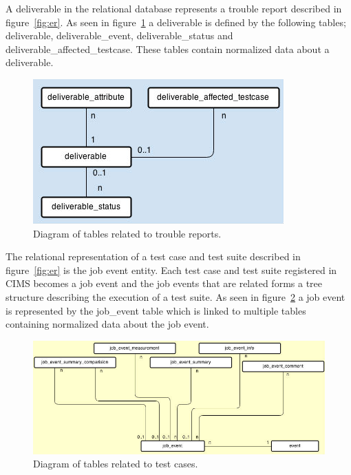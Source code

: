 A deliverable in the relational database represents a trouble report described in figure~\ref{fig:er}. As seen in figure~\ref{fig:deliverable} a deliverable is defined by the following tables; deliverable, deliverable\_event, deliverable\_status and deliverable\_affected\_testcase. These tables contain normalized data about a deliverable. 
\begin{figure}[h!]
\centering
\includegraphics[scale=0.5]{figure/deliverable.jpg}
\caption{Diagram of tables related to trouble reports.}
\label{fig:deliverable}
\end{figure}

The relational representation of a test case and test suite described in figure~\ref{fig:er} is the job event entity. Each test case and test suite registered in CIMS becomes a job event and the job events that are related forms a tree structure describing the execution of a test suite. As seen in figure~\ref{fig:job_event} a job event is represented by the job\_event table which is linked to multiple tables containing normalized data about the job event.
\label{sec:jobEvent}
\begin{figure}[h!]
\centering
\includegraphics[scale=0.5]{figure/job_event.jpg}
\caption{Diagram of tables related to test cases.}
\label{fig:job_event}
\end{figure}







